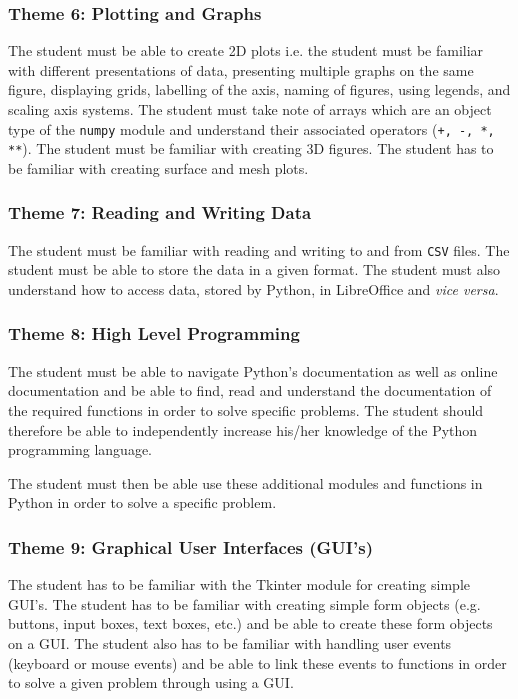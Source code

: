         \subsubsection{Theme 6: Plotting and Graphs}
            The student must be able to create 2D plots i.e. the student must
            be familiar with different presentations of data, presenting
            multiple graphs on the same figure, displaying grids, labelling of
            the axis, naming of figures, using legends, and scaling axis
            systems. The student must take note of arrays which are an object
            type of the \texttt{numpy} module and understand their associated
            operators (\texttt{+, -, *, **}). The student must be familiar
            with creating 3D figures. The student has to be familiar with
            creating surface and mesh plots.

        \subsubsection{Theme 7: Reading and Writing Data}
            The student must be familiar with reading and writing to and from
            \texttt{CSV} files. The student must be able to store the data in
            a given format. The student must also understand how to access
            data, stored by Python, in LibreOffice and \textit{vice versa}.

        \subsubsection{Theme 8: High Level Programming}
            The student must be able to navigate Python's documentation as well
            as online documentation and be able to find, read and understand
            the documentation of the required functions in order to solve
            specific problems. The student should therefore be able to
            independently increase his/her knowledge of the Python programming
            language.

            The student must then be able use these additional modules and
            functions in Python in order to solve a specific problem.

        \subsubsection{Theme 9: Graphical User Interfaces (GUI's)}
            The student has to be familiar with the Tkinter module for creating
            simple GUI's. The student has to be familiar with creating simple
            form objects (e.g. buttons, input boxes, text boxes, etc.) and be
            able to create these form objects on a GUI. The student also has to
            be familiar with handling user events (keyboard or mouse events)
            and be able to link these events to functions in order to solve a
            given problem through using a GUI.

